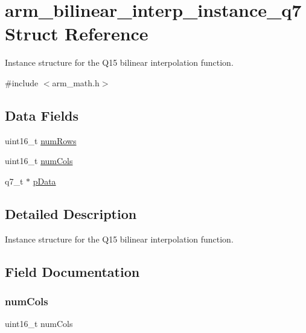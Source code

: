 \hypertarget{structarm__bilinear__interp__instance__q7}{}\section{arm\+\_\+bilinear\+\_\+interp\+\_\+instance\+\_\+q7 Struct Reference}
\label{structarm__bilinear__interp__instance__q7}


Instance structure for the Q15 bilinear interpolation function.  




{\ttfamily \#include $<$arm\+\_\+math.\+h$>$}

\subsection*{Data Fields}
\begin{DoxyCompactItemize}
\item 
uint16\+\_\+t \mbox{\hyperlink{structarm__bilinear__interp__instance__q7_a1bcf80ccdc2acc29198f1592ae300390}{num\+Rows}}
\item 
uint16\+\_\+t \mbox{\hyperlink{structarm__bilinear__interp__instance__q7_a4bb5ec0d13eb4c9cf887aa8366a44117}{num\+Cols}}
\item 
q7\+\_\+t $\ast$ \mbox{\hyperlink{structarm__bilinear__interp__instance__q7_afde7546ea2ec5df9fe42fb04d128a016}{p\+Data}}
\end{DoxyCompactItemize}


\subsection{Detailed Description}
Instance structure for the Q15 bilinear interpolation function. 

\subsection{Field Documentation}
\mbox{\label{structarm__bilinear__interp__instance__q7_a4bb5ec0d13eb4c9cf887aa8366a44117}} 
\subsubsection{\texorpdfstring{numCols}{numCols}}
{\footnotesize\ttfamily uint16\+\_\+t num\+Cols}

